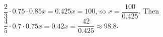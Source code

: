 $\dfrac23\cdot0.75\cdot0.85x=0.425x=100$, so $x=\dfrac{100}{0.425}$. Then $\dfrac45\cdot0.7\cdot0.75x=0.42x=\dfrac{42}{0.425}\approx\boxed{98.8}$.
